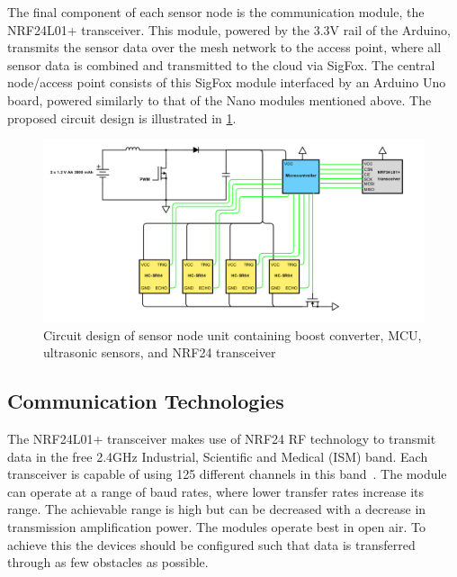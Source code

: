 \documentclass[10pt,twocolumn]{witseiepaper}
\begin{document}
		The final component of each sensor node is the communication module, the NRF24L01+ transceiver. This module, powered by the 3.3V rail of the Arduino, transmits the sensor data over the mesh network to the access point, where all sensor data is combined and transmitted to the cloud via SigFox. The central node/access point consists of this SigFox module interfaced by an Arduino Uno board, powered similarly to that of the Nano modules mentioned above. The proposed circuit design is illustrated in \cref{fig:node-circuit}.

		\begin{figure}[h]
			\centering
			\includegraphics[width=\textwidth]{media/node-circuit.png}
			\caption{Circuit design of sensor node unit containing boost converter, MCU, ultrasonic sensors, and NRF24 transceiver}
			\raggedright
			\label{fig:node-circuit}
		\end{figure}
	
	\subsection{Communication Technologies}
		The NRF24L01+ transceiver makes use of NRF24 RF technology to transmit data in the free 2.4GHz Industrial, Scientific and Medical (ISM) band. Each transceiver is capable of using 125 different channels in this band~\cite{howToMech_NRF24L01Tutorial}. The module can operate at a range of baud rates, where lower transfer rates increase its range. The achievable range is high but can be decreased with a decrease in transmission amplification power. The modules operate best in open air. To achieve this the devices should be configured such that data is transferred through as few obstacles as possible. 
		
	
\end{document}
